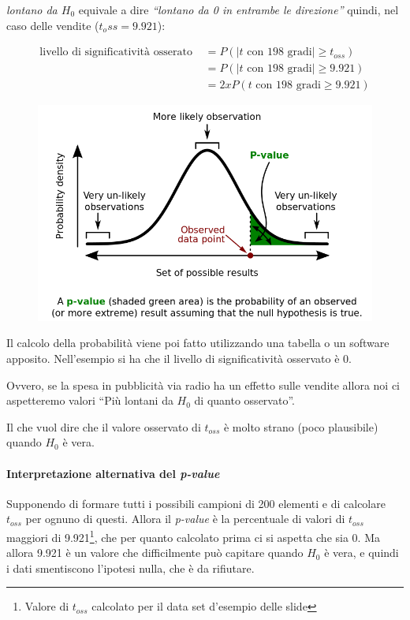 \emph{lontano da $ H_0 $} equivale a dire \emph{``lontano da 0 in entrambe le
direzione''} quindi, nel caso delle vendite ($ t_oss = 9.921 $):

\begin{align*}
\text{livello di significatività osserato } &= P(|t \text{ con 198 gradi}| \geq t_{oss}) \\
																	&= P(|t \text{ con 198 gradi}| \geq 9.921) \\
														           &= 2xP(t \text{ con 198 gradi} \geq 9.921)
\end{align*}

\begin{figure}[htbp]
	\centering
	\includegraphics[width=.7\textwidth]{./notes/immagini/l6-fig7-1.png}
\end{figure}

Il calcolo della probabilità viene poi fatto utilizzando una tabella o
un software apposito. Nell'esempio si ha che il livello di significatività osservato è 0.

Ovvero, se la spesa in pubblicità via radio ha un effetto sulle vendite allora noi ci aspetteremo valori ``Più lontani da $ H_0 $ di quanto
osservato''.

Il che vuol dire che il valore osservato di $ t_{oss} $ è molto strano (poco plausibile) quando $ H_0 $ è vera.

\paragraph{Interpretazione alternativa del \textit{p-value}} Supponendo di formare tutti i possibili campioni di 200 elementi e di calcolare $ t_{oss} $ per ognuno di questi. Allora il \textit{p-value} è la percentuale di valori di $ t_{oss} $ maggiori di 9.921\footnote{Valore di $ t_{oss} $ calcolato per il data set d'esempio delle slide}, che per quanto calcolato prima ci si aspetta che sia 0. Ma allora 9.921 è un valore che difficilmente può capitare quando $ H_0 $ è vera, e quindi i dati smentiscono l'ipotesi nulla, che è da rifiutare.


